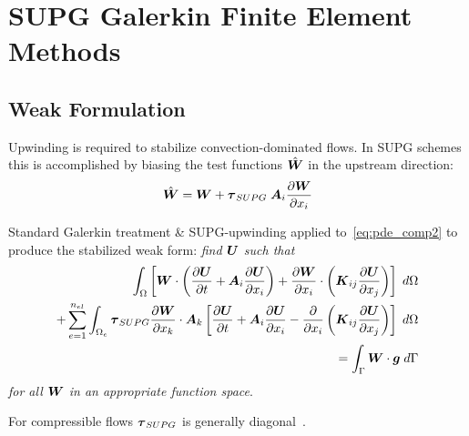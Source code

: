 \documentclass[compress,11pt]{beamer}
\begin{document}
\section[SUPG FEM]{SUPG Galerkin Finite Element Methods}


\subsection{Weak Formulation}
\frame
{
  \vspace{-1.5em}
  \small
  Upwinding is required to stabilize convection-dominated flows. In SUPG schemes this is accomplished by biasing the test functions $\hat{{\boldsymbol{W}}}$ in the upstream direction:
  \begin{equation}
     \hat{{\boldsymbol{W}}} = {\boldsymbol{W}} + {\boldsymbol{\tau}}_{SUPG}\;{\boldsymbol{A}}_i{\frac{\partial{{\boldsymbol{W}}}}{\partial{x_i}}}
  \end{equation}
   {
   	Standard Galerkin treatment \& SUPG-upwinding applied to~\eqref{eq:pde_comp2} to produce the stabilized weak form: \emph{find ${\boldsymbol{U}}$ such that}
   	\begin{eqnarray}
   	  \label{eq:comp_weak_SUPG}
   	  \int_\Omega  \left[ {\boldsymbol{W}}\cdot\left({\frac{\partial{{\boldsymbol{U}}}}{\partial{t}}} + {\boldsymbol{A}}_i {\frac{\partial{{\boldsymbol{U}}}}{\partial{x_i}}} \right) + {\frac{\partial{{\boldsymbol{W}}}}{\partial{x_i}}} \cdot \left( {\boldsymbol{K}}_{ij} {\frac{\partial{{\boldsymbol{U}}}}{\partial{x_j}}} \right) \right] \; d\Omega \nonumber \\
   	  + \sum_{e=1}^{n_{el}} \int_{\Omega_e} {\boldsymbol{\tau}}_{SUPG} {\frac{\partial{{\boldsymbol{W}}}}{\partial{x_k}}}\cdot{\boldsymbol{A}}_k
   	  \left[ {\frac{\partial{{\boldsymbol{U}}}}{\partial{t}}} + {\boldsymbol{A}}_i {\frac{\partial{{\boldsymbol{U}}}}{\partial{x_i}}} - {\frac{\partial{}}{\partial{x_i}}} \left( {\boldsymbol{K}}_{ij} {\frac{\partial{{\boldsymbol{U}}}}{\partial{x_j}}} \right) \right] \; d\Omega  \nonumber \\
   	  = \int_\Gamma {\boldsymbol{W}}\cdot{\boldsymbol{g}} \; d\Gamma
   	\end{eqnarray}
   	\emph{for all ${\boldsymbol{W}}$ in an appropriate function space}.%
   	\vspace{.5em}
  
   	For compressible flows ${\boldsymbol{\tau}}_{SUPG}$ is generally diagonal~\cite{hauke_hughes_compressible_variables}.
   }
}
\end{document}

